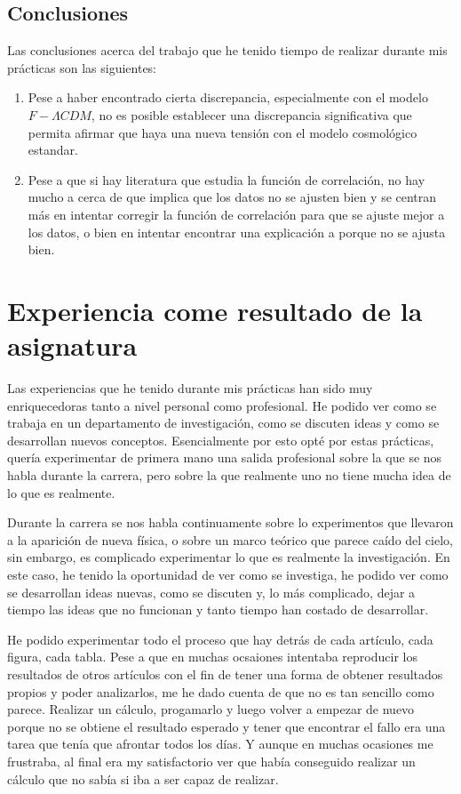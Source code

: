 \documentclass[12pt, a4paper]{article}
\theoremstyle{definition}
\begin{document}
\subsection{Conclusiones}

Las conclusiones acerca del trabajo que he tenido tiempo de realizar durante mis prácticas son las siguientes:
\begin{enumerate}
  \item Pese a haber encontrado cierta discrepancia, especialmente con el modelo $F-\Lambda CDM$, no es posible establecer una discrepancia significativa que permita afirmar que haya una nueva tensión con el modelo cosmológico estandar.
  \item Pese a que si hay literatura que estudia la función de correlación, no hay mucho a cerca de que implica que los datos no se ajusten bien y se centran más en intentar corregir la función de correlación para que se ajuste mejor a los datos, o bien en intentar encontrar una explicación a porque no se ajusta bien.
\end{enumerate}
\section{Experiencia come resultado de la asignatura}

Las experiencias que he tenido durante mis prácticas han sido muy enriquecedoras tanto a nivel personal como profesional. He podido ver como se trabaja en un departamento de investigación, como se discuten ideas y como se desarrollan nuevos conceptos. Esencialmente por esto opté por estas prácticas, quería experimentar de primera mano una salida profesional sobre la que se nos habla durante la carrera, pero sobre la que realmente uno no tiene mucha idea de lo que es realmente.

Durante la carrera se nos habla continuamente sobre lo experimentos que llevaron a la aparición de nueva física, o sobre un marco teórico que parece caído del cielo, sin embargo, es complicado experimentar lo que es realmente la investigación. En este caso, he tenido la oportunidad de ver como se investiga, he podido ver como se desarrollan ideas nuevas, como se discuten y, lo más complicado, dejar a tiempo las ideas que no funcionan y tanto tiempo han costado de desarrollar.

He podido experimentar todo el proceso que hay detrás de cada artículo, cada figura, cada tabla. Pese a que en muchas ocsaiones intentaba reproducir los resultados de otros artículos con el fin de tener una forma de obtener resultados propios y poder analizarlos, me he dado cuenta de que no es tan sencillo como parece. Realizar un cálculo, progamarlo y luego volver a empezar de nuevo porque no se obtiene el resultado esperado y tener que encontrar el fallo era una tarea que tenía que afrontar todos los días. Y aunque en muchas ocasiones me frustraba, al final era my satisfactorio ver que había conseguido realizar un cálculo que no sabía si iba a ser capaz de realizar.
\end{document}
